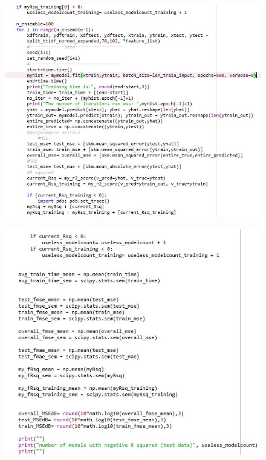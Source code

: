 \documentclass[]{article}
\begin{document}
\begin{figure}
\centering
\includegraphics[width=1\textwidth,height=\textheight]{images/flann5.jpg}
\end{figure}

\begin{figure}
\centering
\includegraphics[width=1\textwidth,height=\textheight]{images/flann6.jpg}
\end{figure}
\end{document}
